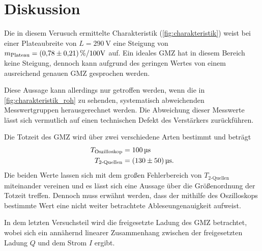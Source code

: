 \section{Diskussion}
\label{sec:Diskussion}
Die in diesem Verusuch ermittelte Charakteristik (\autoref{fig:charakteristik}) weist bei einer Plateaubreite
von $L=\qty{290}{\volt}$ eine Steigung von $m_{\text{Plateau}} = \qty{0.78+-0.21}{\percent\per100\volt}$
auf. Ein ideales GMZ hat in diesem Bereich keine Steigung, dennoch kann aufgrund des geringen Wertes von einem ausreichend
genauen GMZ gesprochen werden.

Diese Aussage kann allerdings nur getroffen werden, wenn die in \autoref{fig:charakteristik_roh} zu sehenden, systematisch 
abweichenden Messwertgruppen herausgerechnet werden. Die Abweichung dieser Messwerte lässt sich vermutlich auf einen
technischen Defekt des Verstärkers zurückführen.

Die Totzeit des GMZ wird über zwei verschiedene Arten bestimmt und beträgt
\begin{align*}
    T_{\text{Oszilloskop}} &= \qty{100}{\micro\second} \\
    T_{\text{2-Quellen}} &= \qty{130+-50}{\micro\second}.
\end{align*}
Die beiden Werte lassen sich mit dem großen Fehlerbereich von $T_{\text{2-Quellen}}$ miteinander vereinen und es lässt sich eine Aussage 
über die Größenordnung der Totzeit treffen. Dennoch muss erwähnt werden, dass der mithilfe des Oszilloskops bestimmte Wert
eine nicht weiter betrachtete Ableseungenauigkeit aufweist.

In dem letzten Versuchsteil wird die freigesetzte Ladung des GMZ betrachtet, wobei sich ein annähernd linearer Zusammenhang
zwischen der freigesetzten Ladung $Q$ und dem Strom $I$ ergibt.